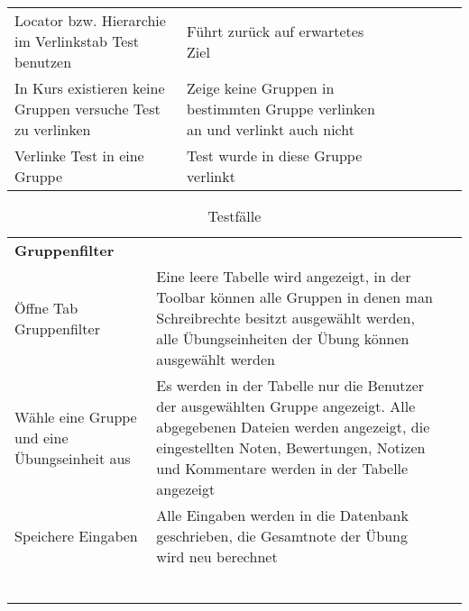 \begin{table}[]
\begin{tabular}{p{6cm}p{7cm}p{3cm}llll}
		Locator bzw. Hierarchie im Verlinkstab Test benutzen                                                                                 & Führt zurück auf erwartetes Ziel                                                                                                                                 & \checkmark           &  &  &  \\
		In Kurs existieren keine Gruppen versuche Test zu verlinken                                                                          & Zeige keine Gruppen in bestimmten Gruppe verlinken an und verlinkt auch nicht                                                                                    & \checkmark           &  &  &  \\
		Verlinke Test in eine Gruppe                                                                                                         & Test wurde in diese Gruppe verlinkt                                                                                                                              & \checkmark           &  &  &  \\
	
	\end{tabular}
\end{table}


\begin{table}[]
	\centering
	\caption{Testfälle}
	\label{table4}
	\begin{tabular}{p{6cm}p{7cm}p{3cm}}
			\textbf{Gruppenfilter}  &   &   \\
		    Öffne Tab Gruppenfilter	& Eine leere Tabelle wird angezeigt, in der Toolbar können alle Gruppen in denen man Schreibrechte besitzt ausgewählt werden, alle Übungseinheiten der Übung können ausgewählt werden &\checkmark \\
			Wähle eine Gruppe und eine Übungseinheit aus & Es werden in der Tabelle nur die Benutzer der ausgewählten Gruppe angezeigt. Alle abgegebenen Dateien werden angezeigt, die eingestellten Noten, Bewertungen, Notizen und Kommentare werden in der Tabelle angezeigt &\checkmark \\
			Speichere Eingaben & Alle Eingaben werden in die Datenbank geschrieben, die Gesamtnote der Übung wird neu berechnet &\checkmark \\
			& &\checkmark \\
			& &\checkmark \\
			& &\checkmark \\
			& &\checkmark \\
			& &\checkmark \\
			& &\checkmark \\
			

	\end{tabular}
\end{table}

